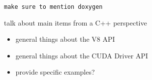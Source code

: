 
\begin{verbatim}
make sure to mention doxygen
\end{verbatim}

talk about main items from a C++ perspective

\begin{itemize}
\item general things about the V8 API
\item general things about the CUDA Driver API
\item provide specific examples?
\end{itemize}

